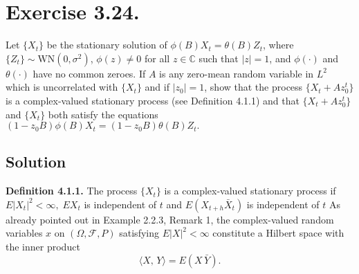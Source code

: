 \section*{Exercise 3.24.}

Let $\{X_t\}$ be the stationary solution of $\phi(B)X_t = \theta(B)Z_t$, where $\{Z_t\} \sim \text{WN}(0, \sigma^2)$, $\phi(z) \neq 0$ for all $z \in \mathbb{C}$ such that $|z| = 1$, and $\phi(\cdot)$ and $\theta(\cdot)$ have no common zeroes. If $A$ is any zero-mean random variable in $L^2$ which is uncorrelated with $\{X_t\}$ and if $|z_0| = 1$, show that the process $\{X_t + A z_0^t\}$ is a complex-valued stationary process (see Definition 4.1.1) and that $\{X_t + A z_0^t\}$ and $\{X_t\}$ both satisfy the equations $(1 - z_0 B)\phi(B)X_t = (1 - z_0 B)\theta(B)Z_t.$

\subsection*{Solution}

\textbf{Definition 4.1.1.} The process $\{X_{t} \}$ is a complex-valued stationary process if $E | X_{t} |^{2}  <  \infty, \; E X_{t}$ is independent of $t$ and $E ( X_{t+h} {\bar{X}}_{t} )$ is independent of $t$ 
As already pointed out in Example 2.2.3, Remark 1, the complex-valued random variables $x$ on $( \Omega, {\mathcal{F}}, P )$ satisfying $E | X |^{2} < \infty$ constitute a Hilbert space with the inner product
\[ \langle X, \, Y \rangle=E ( X \, \bar{Y} ). \]

